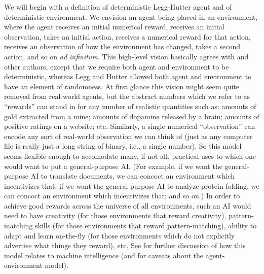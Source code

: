 \documentclass[twoside,11pt]{article}
\begin{document}
We will begin with a definition of deterministic Legg-Hutter agent and of
deterministic environment.
We envision an agent being placed in an environment, where the agent
receives an initial numerical reward, receives an initial observation, takes an initial
action, receives a numerical reward for that action, receives an observation of how the
environment has changed, takes a second action, and so on \emph{ad infinitum}.
This high-level vision basically agrees with \citet{hutter2007}
and other authors,
except that we require both agent and environment to
be deterministic, whereas Legg and Hutter allowed both agent and environment to have
an element of randomness.
At first glance this vision might seem quite removed from real-world
agents, but the abstract numbers which we refer to as ``rewards'' can
stand in for any number of realistic quantities such as: amounts of gold
extracted from a mine; amounts of dopamine released by a brain; amounts of positive
ratings on a website; etc. Similarly, a single numerical ``observation'' can
encode any sort of real-world observation we can think of (just as any computer file
is really just a long string of binary, i.e., a single number).
So this model seems flexible enough to accomodate many, if not all, practical uses
to which one would want to put a general-purpose AI.
(For example, if we want the general-purpose AI to translate documents, we can concoct
an environment which incentivizes that; if we want the general-purpose AI to analyze
protein-folding, we can concoct an environment which incentivizes that; and so on.)
In order to achieve good rewards across the universe of all environments,
such an AI would need to have creativity (for those environments that reward creativity),
pattern-matching skills (for those environments that reward pattern-matching),
ability to adapt and learn on-the-fly (for those environments which do not explicitly
advertise what things they reward), etc.
See \citet{hutter2007} for further discussion of how this model relates
to machine intelligence (and for caveats about the agent-environment
model).
\end{document}

